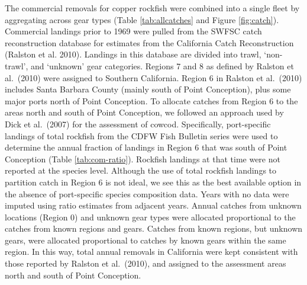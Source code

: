 \documentclass[11pt,
  english,
  a4paper,
]{article}
\begin{document}
The commercial removals for copper rockfish were combined into a single fleet by aggregating across gear types (Table \ref{tab:allcatches} and Figure \ref{fig:catch}). Commercial landings prior to 1969 were pulled from the SWFSC catch reconstruction database for estimates from the California Catch Reconstruction {(Ralston et al. 2010)\leavevmode\tagmcend\tagstructend}. Landings in this database are divided into trawl, `non-trawl', and `unknown' gear categories. Regions 7 and 8 as defined by Ralston et al.~{(2010)\leavevmode\tagmcend\tagstructend} were assigned to Southern California. Region 6 in Ralston et al.~{(2010)\leavevmode\tagmcend\tagstructend} includes Santa Barbara County (mainly south of Point Conception), plus some major ports north of Point Conception. To allocate catches from Region 6 to the areas north and south of Point Conception, we followed an approach used by Dick et al.~{(2007)\leavevmode\tagmcend\tagstructend} for the assessment of cowcod. Specifically, port-specific landings of total rockfish from the CDFW Fish Bulletin series were used to determine the annual fraction of landings in Region 6 that was south of Point Conception (Table \ref{tab:com-ratio}). Rockfish landings at that time were not reported at the species level. Although the use of total rockfish landings to partition catch in Region 6 is not ideal, we see this as the best available option in the absence of port-specific species composition data. Years with no data were imputed using ratio estimates from adjacent years. Annual catches from unknown locations (Region 0) and unknown gear types were allocated proportional to the catches from known regions and gears. Catches from known regions, but unknown gears, were allocated proportional to catches by known gears within the same region. In this way, total annual removals in California were kept consistent with those reported by Ralston et al.~{(2010)\leavevmode\tagmcend\tagstructend}, and assigned to the assessment areas north and south of Point Conception.

\leavevmode\tagmcend\tagstructend\par

\end{document}
